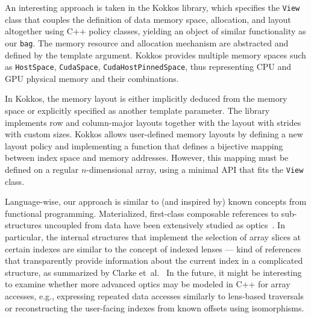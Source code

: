 An interesting approach is taken in the Kokkos library, which specifies the \texttt{View} class that couples the definition of data memory space, allocation, and layout altogether using C++ policy classes, yielding an object of similar functionality as our \texttt{bag}. The memory resource and allocation mechanism are abstracted and defined by the template argument. Kokkos provides multiple memory spaces such as \texttt{HostSpace}, \texttt{CudaSpace}, \texttt{CudaHostPinnedSpace}, thus representing CPU and GPU physical memory and their combinations.

In Kokkos, the memory layout is either implicitly deduced from the memory space or explicitly specified as another template parameter. The library implements row and column-major layouts together with the layout with strides with custom sizes. Kokkos allows user-defined memory layouts by defining a new layout policy and implementing a function that defines a bijective mapping between index space and memory addresses. However, this mapping must be defined on a regular $n$-dimensional array, using a minimal API that fits the \texttt{View} class.

Language-wise, our approach is similar to (and inspired by) known concepts from functional programming. Materialized, first-class composable references to sub-structures uncoupled from data have been extensively studied as optics~\cite{foster2007combinators}. In particular, the internal structures that implement the selection of array slices at certain indexes are similar to the concept of indexed lenses --- kind of references that transparently provide information about the current index in a complicated structure, as summarized by Clarke et~al.~\cite{clarke2020profunctor} In the future, it might be interesting to examine whether more advanced optics may be modeled in C++ for array accesses, e.g., expressing repeated data accesses similarly to lens-based traversals or reconstructing the user-facing indexes from known offsets using isomorphisms.







